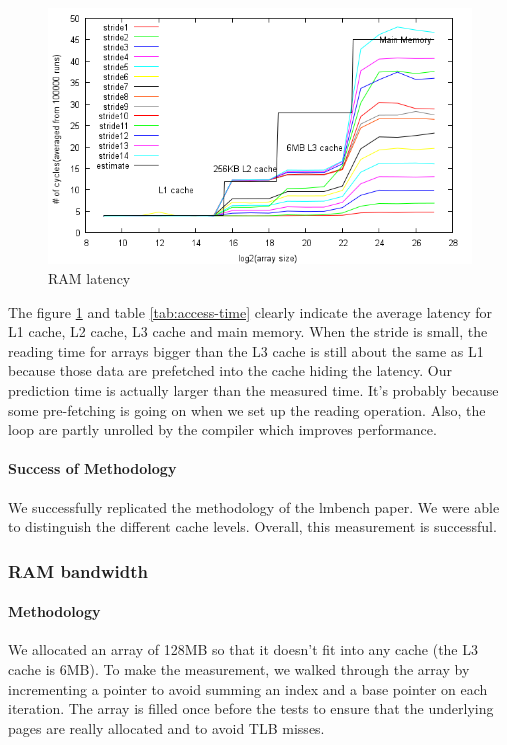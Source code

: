 \begin{figure}[h!]
\begin{center}
\includegraphics[scale=0.8]{memoryLatencyImage}
\end{center}
\caption {RAM latency\label{fig:access-time}}

\end{figure}


The figure \ref{fig:access-time} and table \ref{tab:access-time} clearly
indicate the average latency for L1 cache, L2 cache, L3 cache and main memory.
When the stride is small, the reading time for arrays bigger than the L3 cache is still
about the same as L1 because those data are prefetched into the cache hiding the
latency.
Our prediction time is actually larger than the measured time.
It's probably because some pre-fetching is going on when we set up the reading
operation.
Also, the loop are partly unrolled by the compiler which improves performance.

\paragraph{Success of Methodology}
We successfully replicated the methodology of the lmbench paper.
We were able to distinguish the different cache levels.
Overall, this measurement is successful.



\subsubsection{RAM bandwidth}
\paragraph{Methodology}
We allocated an array of 128MB so that it doesn't fit into any cache (the L3 cache is 6MB).
To make the measurement, we walked through the array by incrementing a pointer to avoid summing an index and a base pointer on each iteration.
The array is filled once before the tests to ensure that the underlying pages are really allocated and to avoid TLB misses.

